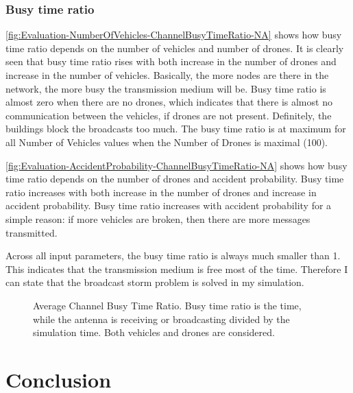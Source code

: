 \documentclass[]{nsm-thesis}
\begin{document}
\subsection{Busy time ratio}

\cref{fig:Evaluation-NumberOfVehicles-ChannelBusyTimeRatio-NA} shows how busy time ratio depends on the number of vehicles and number of drones. It is clearly seen that busy time ratio rises with both increase in the number of drones and increase in the number of vehicles. Basically, the more nodes are there in the network, the more busy the transmission medium will be. Busy time ratio is almost zero when there are no drones, which indicates that there is almost no communication between the vehicles, if drones are not present. Definitely, the buildings block the broadcasts too much. The busy time ratio is at maximum for all Number of Vehicles values when the Number of Drones is maximal (100).

\cref{fig:Evaluation-AccidentProbability-ChannelBusyTimeRatio-NA} shows how busy time ratio depends on the number of drones and accident probability.
Busy time ratio increases with both increase in the number of drones and increase in accident probability. Busy time ratio increases with accident probability for a simple reason: if more vehicles are broken, then there are more messages transmitted.

Across all input parameters, the busy time ratio is always much smaller than 1. This indicates that the transmission medium is free most of the time. Therefore I can state that the broadcast storm problem is solved in my simulation.


\begin{figure}%
	\centering
	\hfill
	\hfill
	\caption{Average Channel Busy Time Ratio. Busy time ratio is the time, while the antenna is receiving or broadcasting divided by the simulation time. Both vehicles and drones are considered.}%
	\label{fig:Evaluation-ChannelBusyTimeRatio}%
\end{figure}


\chapter{Conclusion}

\cleardoublepage

\listofabbreviations
\clearpage

\listoffigures
\clearpage

\listoftables
\clearpage

\printbibliography
\end{document}
